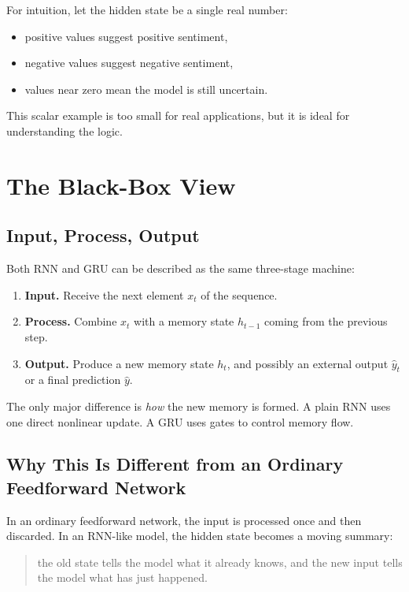 \documentclass[12pt,a4paper]{article}
\begin{document}
For intuition, let the hidden state be a single real number:
\begin{itemize}
  \item positive values suggest positive sentiment,
  \item negative values suggest negative sentiment,
  \item values near zero mean the model is still uncertain.
\end{itemize}

This scalar example is too small for real applications, but it is ideal for understanding the logic.

\section{The Black-Box View}

\subsection{Input, Process, Output}

Both RNN and GRU can be described as the same three-stage machine:

\begin{enumerate}
  \item \textbf{Input.} Receive the next element \(x_t\) of the sequence.
  \item \textbf{Process.} Combine \(x_t\) with a memory state \(h_{t-1}\) coming from the previous step.
  \item \textbf{Output.} Produce a new memory state \(h_t\), and possibly an external output \(\hat{y}_t\) or a final prediction \(\hat{y}\).
\end{enumerate}

The only major difference is \emph{how} the new memory is formed. A plain RNN uses one direct nonlinear update. A GRU uses gates to control memory flow.

\subsection{Why This Is Different from an Ordinary Feedforward Network}

In an ordinary feedforward network, the input is processed once and then discarded. In an RNN-like model, the hidden state becomes a moving summary:
\begin{quote}
the old state tells the model what it already knows, and the new input tells the model what has just happened.
\end{quote}
\end{document}
